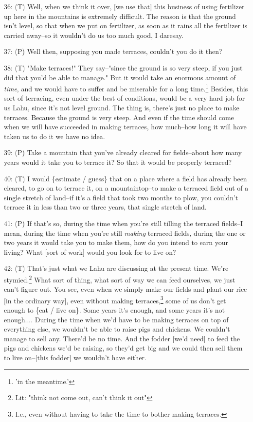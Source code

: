 36: (T) Well, when we think it over, [we use that] this business of using fertilizer
up here in the mountains is extremely difficult. The reason is that the ground
isn't level, so that when we put on fertilizer, as soon as it rains all the fertilizer
is carried away--so it wouldn't do us too much good, I daresay.

37: (P) Well then, supposing you made terraces, couldn't you do it then?

38: (T) "Make terraces!" They say--"since the ground
is so very steep, if you just did that you'd be able to manage." But it
would take an enormous amount of \textit{time}, and we would have to suffer and
be miserable for a long time.\footnote{'in the meantime.'} Besides, this sort of terracing, even under the
best of conditions, would be a very hard job for us Lahu, since it's not level
ground. The thing is, there's just no place to make terraces. Because the ground
is very steep. And even if the time should come when we will have succeeded in
making terraces, how much--how long it will have taken us to do it we have no idea.

39: (P) Take a mountain that you've already cleared for fields--about how many
years would it take you to terrace it? So that it would be properly terraced?

40: (T) I would \{estimate / guess\} that on a place where a field has already
been cleared, to go on to terrace it, on a mountaintop--to make a terraced field
out of a single stretch of land--if it's a field that took two months to plow,
you couldn't terrace it in less than two or three years, that single stretch of
land.

41: (P) If that's so, during the time when you're still tilling the terraced fields--I
mean, during the time when you're still \textit{making} terraced fields, during
the one or two years it would take you to make them, how do you intend to earn
your living? What [sort of work] would you look for to live on?

42: (T) That's just what we Lahu are discussing at the present time. We're stymied.\footnote{Lit: "think not come out, can't think it out"}
What sort of thing, what sort of way we can feed ourselves, we just can't figure
out. You see, even when we simply make our fields and plant our rice [in the ordinary
way], even without making terraces,\footnote{I.e., even without having to take the time to bother making terraces.} some of us don't get enough to \{eat /
live on\}. Some years it's enough, and some years it's not enough.... During the
time when we'd have to be making terraces on top of everything else, we wouldn't
be able to raise pigs and chickens. We couldn't manage to sell any. There'd be
no time. And the fodder [we'd need] to feed the pigs and chickens we'd be raising,
so they'd get big and we could then sell them to live on--[this fodder] we wouldn't
have either.

